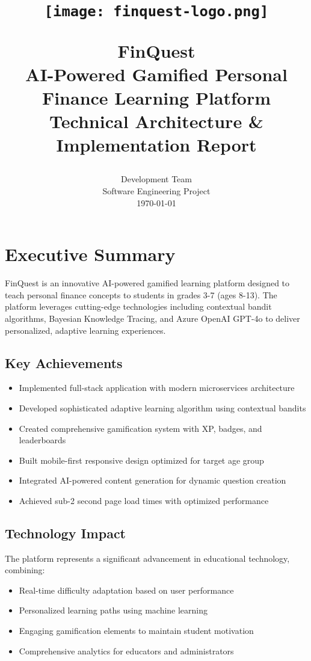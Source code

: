 \documentclass[12pt,a4paper]{article}
\title{
    \vspace{-1in}
    \begin{figure}[H]
        \centering
        \texttt{[image: finquest-logo.png]}
    \end{figure}
    \vspace{-0.5in}
    \Huge\textbf{FinQuest}\\
    \Large AI-Powered Gamified Personal Finance Learning Platform\\
    \large Technical Architecture \& Implementation Report
}
\author{
    Development Team\\
    Software Engineering Project\\
    \today
}
\date{}
\begin{document}
\maketitle
\newpage

\tableofcontents
\newpage

\listoffigures
\newpage

\listoftables
\newpage

\section{Executive Summary}

FinQuest is an innovative AI-powered gamified learning platform designed to teach personal finance concepts to students in grades 3-7 (ages 8-13). The platform leverages cutting-edge technologies including contextual bandit algorithms, Bayesian Knowledge Tracing, and Azure OpenAI GPT-4o to deliver personalized, adaptive learning experiences.

\subsection{Key Achievements}
\begin{itemize}
    \item Implemented full-stack application with modern microservices architecture
    \item Developed sophisticated adaptive learning algorithm using contextual bandits
    \item Created comprehensive gamification system with XP, badges, and leaderboards
    \item Built mobile-first responsive design optimized for target age group
    \item Integrated AI-powered content generation for dynamic question creation
    \item Achieved sub-2 second page load times with optimized performance
\end{itemize}

\subsection{Technology Impact}
The platform represents a significant advancement in educational technology, combining:
\begin{itemize}
    \item Real-time difficulty adaptation based on user performance
    \item Personalized learning paths using machine learning
    \item Engaging gamification elements to maintain student motivation
    \item Comprehensive analytics for educators and administrators
\end{itemize}
\end{document}
